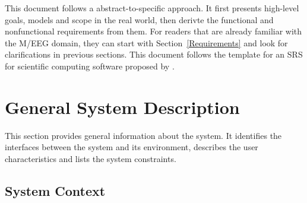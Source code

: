 \documentclass[12pt]{article}
\begin{document}
  
This document follows a abstract-to-specific approach. It first presents high-level goals, models and scope in the real world, then derivte the functional and nonfunctional requirements from them. 
For readers that are already familiar with the M/EEG domain, they can start with Section~\ref{Requirements} and look for clarifications in previous sections. 
This document follows the template for an SRS for scientific computing software proposed by \citet{SmithAndLai2005, SmithEtAl2007, SmithAndKoothoor2016}. 





\section{General System Description}

This section provides general information about the system.  It identifies the
interfaces between the system and its environment, describes the user
characteristics and lists the system constraints.  



\subsection{System Context}
\end{document}
